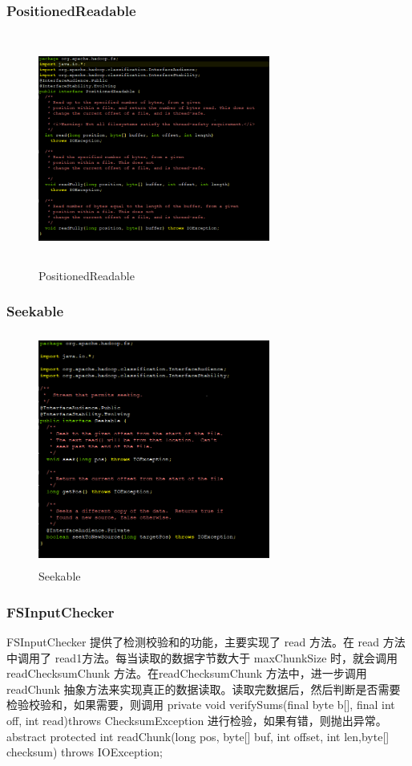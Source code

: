 	\subsubsection{PositionedReadable}
	\begin{figure}
		\centering
		\includegraphics[width=3in,height=3in]{UML/inputstream/PositionedReadable.png}
		\caption{PositionedReadable}
		\label{fig:graph5}
	\end{figure}
	
	
	 \subsubsection{Seekable}

	\begin{figure}
		\centering
		\includegraphics[width=3in,height=3in]{UML/inputstream/Seekable.png}
		\caption{Seekable}
		\label{fig:graph6}
	\end{figure}
	
	\subsubsection{FSInputChecker}
	FSInputChecker 提供了检测校验和的功能，主要实现了 read 方法。在 read 方法中调用了 read1方法。每当读取的数据字节数大于 maxChunkSize 时，就会调用 readChecksumChunk 方法。在readChecksumChunk 方法中，进一步调用 readChunk 抽象方法来实现真正的数据读取。读取完数据后，然后判断是否需要检验校验和，如果需要，则调用 private void verifySums(final byte b[], final int off, int read)throws ChecksumException 进行检验，如果有错，则抛出异常。abstract protected int readChunk(long pos, byte[] buf, int offset, int len,byte[] checksum) throws IOException;
	
